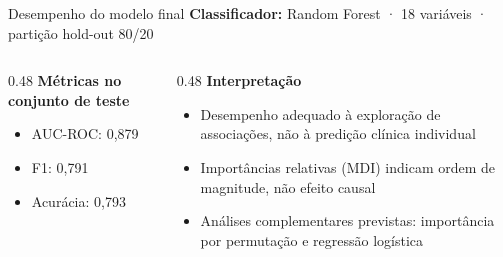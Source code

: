 \documentclass[aspectratio=169,xcolor=table]{beamer}
\begin{document}
\begin{frame}{Desempenho do modelo final}
    \textbf{Classificador:} Random Forest · 18 variáveis · partição hold-out 80/20

    \vspace{0.4em}
    \begin{columns}[T]
        \begin{column}{0.48\textwidth}
            \textbf{Métricas no conjunto de teste}
            \begin{itemize}
                \item AUC-ROC: 0{,}879
                \item F1: 0{,}791
                \item Acurácia: 0{,}793
            \end{itemize}
        \end{column}
        \begin{column}{0.48\textwidth}
            \textbf{Interpretação}
            \begin{itemize}
                \item Desempenho adequado à exploração de associações, não à predição clínica individual
                \item Importâncias relativas (MDI) indicam ordem de magnitude, não efeito causal
                \item Análises complementares previstas: importância por permutação e regressão logística
            \end{itemize}
        \end{column}
    \end{columns}
\end{frame}
\end{document}
